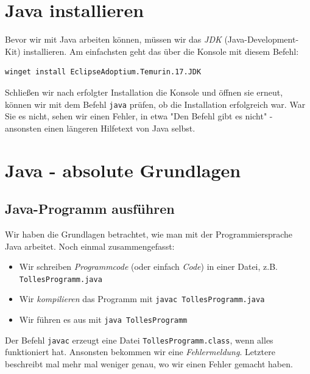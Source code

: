 \documentclass[ngerman,11pt]{article}
\begin{document}
    \vspace{0.5cm}


    \section{Java installieren}
    Bevor wir mit Java arbeiten können, müssen wir das \textit{JDK} (Java-Development-Kit) installieren.
    Am einfachsten geht das über die Konsole mit diesem Befehl:

    \begin{lstlisting}
winget install EclipseAdoptium.Temurin.17.JDK
    \end{lstlisting}

    Schließen wir nach erfolgter Installation die Konsole und öffnen sie erneut, können wir mit dem
    Befehl \lstinline{java} prüfen, ob die Installation erfolgreich war.
    War Sie es nicht, sehen wir einen Fehler, in etwa "Den Befehl gibt es nicht" -
    ansonsten einen längeren Hilfetext von Java selbst.


    \section{Java - absolute Grundlagen}

    \vspace{0.5cm}

    \subsection{Java-Programm ausführen}
    Wir haben die Grundlagen betrachtet, wie man mit der Programmiersprache Java arbeitet.
    Noch einmal zusammengefasst:

    \begin{itemize}
        \item Wir schreiben \textit{Programmcode} (oder einfach \textit{Code}) in einer Datei, z.B. \lstinline{TollesProgramm.java}
        \item Wir \textit{kompilieren} das Programm mit \lstinline{javac TollesProgramm.java}
        \item Wir führen es aus mit \lstinline{java TollesProgramm}
    \end{itemize}

    Der Befehl \lstinline{javac} erzeugt eine Datei \lstinline{TollesProgramm.class}, wenn alles funktioniert hat.
    Ansonsten bekommen wir eine \textit{Fehlermeldung}.
    Letztere beschreibt mal mehr mal weniger genau, wo wir einen Fehler gemacht haben. \\
\end{document}
